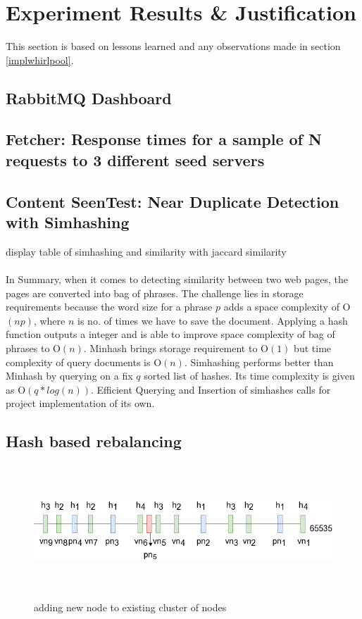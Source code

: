 \chapter{Experiment Results \& Justification}
This section is based on lessons learned and any observations made in section \ref{implwhirlpool}.

\section{RabbitMQ Dashboard}

\pagebreak

\section{Fetcher: Response times for a sample of N requests to 3 different seed servers}

\pagebreak

\section{Content SeenTest: Near Duplicate Detection with Simhashing}\label{handle_dedupe}
display table of simhashing and similarity with jaccard similarity
\\
\\
In Summary, when it comes to detecting similarity between two web pages, the pages are converted into
bag of phrases. The challenge lies in storage requirements because the word size for a phrase $p$ adds
a space complexity of O$(np)$, where $n$ is no. of times we have to save the document. Applying a hash
function outputs a integer and is able to improve space complexity of bag of phrases to O$(n)$.
Minhash\cite{dedupe} brings storage requirement to O$(1)$ but time complexity of query documents is
O$(n)$. Simhashing\cite{dedupe} performs better than Minhash by querying on a fix $q$ sorted list of
hashes. Its time complexity is given as O$(q * log(n))$. Efficient Querying and Insertion of simhashes
calls for project implementation of its own.

\pagebreak

\section{Hash based rebalancing}
\begin{figure}[h!]
  \centering
  \includegraphics[width=12cm,height=5cm,keepaspectratio]{../media/crawler/addingnode.png}
  \caption{adding new node to existing cluster of nodes}
  \label{fig:addingnode}
\end{figure}

